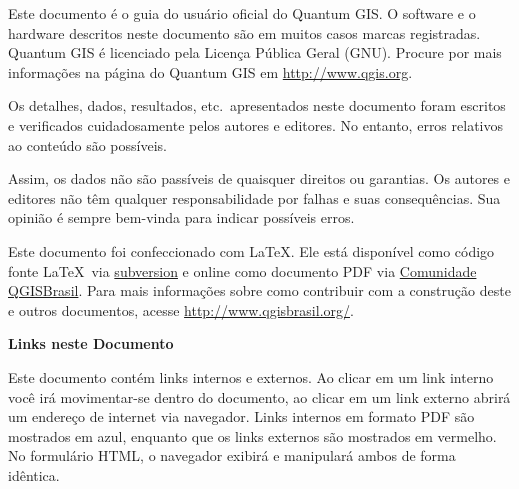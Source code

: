 \frontmatter
\pagestyle{scrplain}
\vspace{1cm}


Este documento é o guia do usuário oficial do Quantum GIS. O software e o hardware descritos neste documento são em muitos casos marcas registradas. Quantum GIS é licenciado pela Licença Pública Geral (GNU). Procure por mais informações na página do Quantum GIS em 
\url{http://www.qgis.org}.
\par\bigskip
Os detalhes, dados, resultados, etc.~apresentados neste documento foram escritos e verificados cuidadosamente pelos autores e editores. No entanto, erros relativos ao conteúdo são possíveis.
\par\bigskip
Assim, os dados não são passíveis de quaisquer direitos ou garantias. Os autores e editores não têm qualquer responsabilidade por falhas e suas consequências. Sua opinião é sempre bem-vinda para indicar possíveis erros.
\par\bigskip
Este documento foi confeccionado com \LaTeX. Ele está disponível como código fonte \LaTeX~via \href{http://wiki.qgis.org/qgiswiki/DocumentationWritersCorner}{subversion} 
e online como documento PDF via \href{http://qgisbrasil.wordpress.com/documentacao/}{Comunidade QGISBrasil}. 
Para mais informações sobre como contribuir com a construção deste e outros documentos, acesse \url{http://www.qgisbrasil.org/}.

\vspace{1cm}
\noindent
\textbf{Links neste Documento}
\par\bigskip
Este documento contém links internos e externos. Ao clicar em um link interno você irá movimentar-se dentro do documento, ao clicar em um link externo abrirá um endereço de internet via navegador. Links internos em formato PDF são mostrados em azul, enquanto que os links externos são mostrados em vermelho. No formulário HTML, o navegador exibirá e manipulará ambos de forma idêntica.

\newpage

